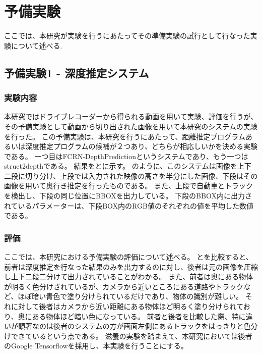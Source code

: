 \chapter{予備実験}
ここでは、本研究が実験を行うにあたってその準備実験の試行として行なった実験について述べる.
\section{予備実験1 - 深度推定システム}
\subsection{実験内容}
本研究ではドライブレコーダーから得られる動画を用いて実験、評価を行うが、その予備実験として動画から切り出された画像を用いて本研究のシステムの実験を行った。
この予備実験は、本研究を行うにあたって、距離推定プログラムあるいは深度推定プログラムの候補が２つあり、どちらが相応しいかを決める実験である。
一つ目はFCRN-DepthPrediction\cite{laina2016deeper}というシステムであり、もう一つはstruct2depthである。
結果をとに示す。
のように、このシステムは画像を上下二段に切り分け、上段では入力された映像の高さを半分にした画像、下段はその画像を用いて奥行き推定を行ったものである。
また、上段で自動車とトラックを検出し、下段の同じ位置にBBOXを出力している。
下段のBBOX内に出力されているパラメーターは、下段BOX内のRGB値のそれぞれの値を平均した数値である。

\subsection{評価}
ここでは、本研究における予備実験の評価について述べる。
とを比較すると、前者は深度推定を行なった結果のみを出力するのに対し、後者は元の画像を圧縮し上下二段二分けて出力されていることがわかる。
また、前者は奥にある物体が明るく色分けされているが、カメラから近いところにある道路やトラックなど、ほぼ暗い青色で塗り分けられているだけであり、物体の識別が難しい。
それに対して後者はカメラから近い距離にある物体ほど明るく塗り分けられており、奥にある物体ほど暗い色になっている。
前者と後者を比較した際、特に違いが顕著なのは後者のシステムの方が画面左側にあるトラックをはっきりと色分けできているという点である。
滋養の実験を踏まえて、本研究においては後者のGoogle Tensorflowを採用し、本実験を行うことにする。

